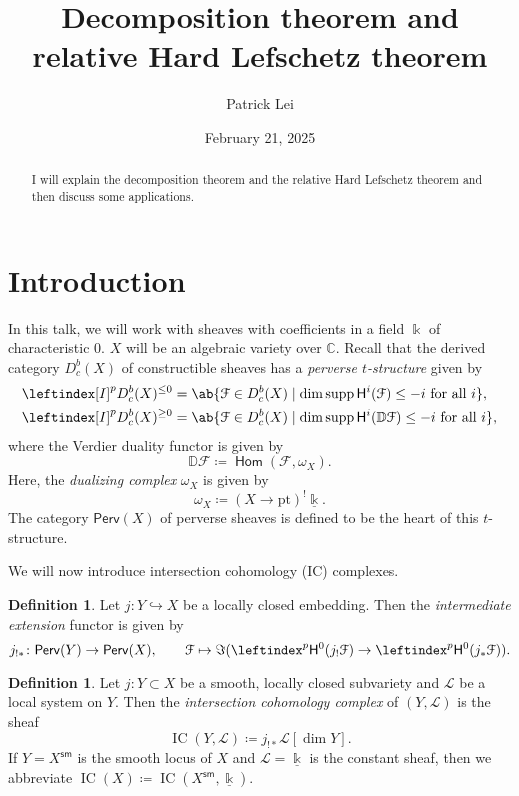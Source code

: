 \documentclass{amsart}
\title{Decomposition theorem and relative Hard Lefschetz theorem}
\author{Patrick Lei}
\date{February 21, 2025}
\theoremstyle{definition}
\newtheorem{defn}[thm]{Definition}
\theoremstyle{remark}
\theoremstyle{plain}
\theoremstyle{definition}
\theoremstyle{remark}
\newcommand{\C}{\mathbb{C}}
\newcommand{\D}{\mathbb{D}}
\renewcommand{\k}{\Bbbk}
\newcommand{\sH}{\mathsf{H}}
\newcommand{\mc}[1]{\mathcal{#1}}
\newcommand{\mr}[1]{\mathrm{#1}}
\newcommand{\on}[1]{\operatorname{#1}}
\newcommand{\ms}[1]{\mathsf{#1}}
\newcommand{\ul}[1]{\underline{#1}}
\newcommand{\1}{\mathbf{1}}
\newcommand{\2}{\mathbf{2}}
\newcommand{\3}{\mathbf{3}}
\newcommand{\pt}{\mr{pt}}
\DeclareMathOperator{\iHom}{\ms{Hom}}
\DeclareMathOperator{\IC}{IC}
\begin{document}
    
\begin{abstract}
    I will explain the decomposition theorem and the relative Hard Lefschetz theorem and then discuss some applications.
\end{abstract}

\maketitle

\section{Introduction}%
\label{sec:Introduction}

In this talk, we will work with sheaves with coefficients in a field $\k$ of characteristic $0$. $X$ will be an algebraic variety over $\C$.
Recall that the derived category $D^b_c(X)$ of constructible sheaves has a \textit{perverse $t$-structure} given by 
\begin{align*}
    \leftindex[I]^p D^b_c(X)^{\leq 0} &= \ab\{ \mc{F} \in D_c^b(X) \mid \dim \on{supp} \ms{H}^i(\mc{F}) \leq -i \text{ for all } i \}, \\
    \leftindex[I]^p D^b_c(X)^{\geq 0} &= \ab\{ \mc{F} \in D_c^b(X) \mid \dim \on{supp} \ms{H}^i(\D\mc{F}) \leq -i \text{ for all } i \}, 
\end{align*}
where the Verdier duality functor is given by
\[ \D \mc{F} \coloneqq \iHom(\mc{F}, \omega_X). \]
Here, the \textit{dualizing complex} $\omega_X$ is given by
\[ \omega_X \coloneqq (X \to \pt)^! \ul{\k}. \]
The category $\ms{Perv}(X)$ of perverse sheaves is defined to be the heart of this $t$-structure.

We will now introduce intersection cohomology (IC) complexes. 
\begin{defn}
    Let $j \colon Y \hookrightarrow X$ be a locally closed embedding. Then the \textit{intermediate extension} functor is given by
    \[ j_{!*} \colon \ms{Perv}(Y) \to \ms{Perv}(X), \qquad \mc{F} \mapsto \Im (\leftindex^p \sH^0(j_! \mc{F}) \to \leftindex^p \sH^0(j_* \mc{F})). \]
\end{defn}

\begin{defn}
    Let $j \colon Y \subset X$ be a smooth, locally closed subvariety and $\mc{L}$ be a local system on $Y$. Then the \textit{intersection cohomology complex} of $(Y, \mc{L})$ is the sheaf
    \[ \on{IC}(Y, \mc{L}) \coloneqq j_{!*} \mc{L}[\dim Y]. \]
    If $Y = X^{\ms{sm}}$ is the smooth locus of $X$ and $\mc{L} = \ul{\k}$ is the constant sheaf, then we abbreviate $\IC(X) \coloneqq \IC(X^{\ms{sm}}, \ul{\k})$.
\end{defn}
\end{document}
